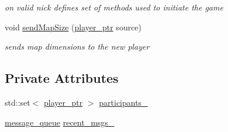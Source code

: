 \begin{DoxyCompactItemize}
\begin{DoxyCompactList}\small\item\em on valid nick defines set of methods used to initiate the game \end{DoxyCompactList}\item 
void \hyperlink{classwebsocket_1_1GameBoard_a93379a2caec9ae069ffef81472e608f9}{send\+Map\+Size} (\hyperlink{namespacewebsocket_aec8d52893bdf524a1412533a63b006a3}{player\+\_\+ptr} source)
\begin{DoxyCompactList}\small\item\em sends map dimensions to the new player \end{DoxyCompactList}\end{DoxyCompactItemize}
\subsection*{Private Attributes}
\begin{DoxyCompactItemize}
\item 
std\+::set$<$ \hyperlink{namespacewebsocket_aec8d52893bdf524a1412533a63b006a3}{player\+\_\+ptr} $>$ \hyperlink{classwebsocket_1_1GameBoard_a49ad7c4c31e144021a4c7e12c73d0433}{participants\+\_\+}
\item 
\hyperlink{namespacewebsocket_ae3fdf29bb367b5baf5be703253a4edfa}{message\+\_\+queue} \hyperlink{classwebsocket_1_1GameBoard_a87c11dd6d2f39fa8b0100059c27179a7}{recent\+\_\+msgs\+\_\+}
\end{DoxyCompactItemize}
